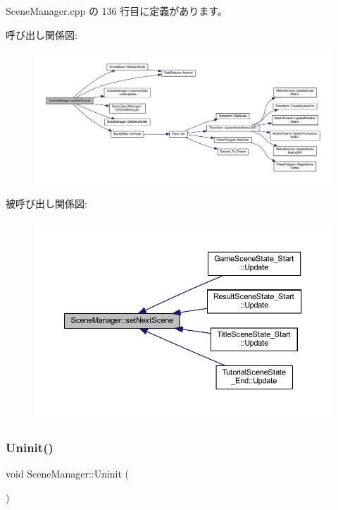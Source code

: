  Scene\+Manager.\+cpp の 136 行目に定義があります。

呼び出し関係図\+:
\nopagebreak
\begin{figure}[H]
\begin{center}
\leavevmode
\includegraphics[width=350pt]{class_scene_manager_a208cc1690dcb260ae7fb94d13118f6ce_cgraph}
\end{center}
\end{figure}
被呼び出し関係図\+:
\nopagebreak
\begin{figure}[H]
\begin{center}
\leavevmode
\includegraphics[width=350pt]{class_scene_manager_a208cc1690dcb260ae7fb94d13118f6ce_icgraph}
\end{center}
\end{figure}
\mbox{\label{class_scene_manager_ae3ff21f2261fc50f1e860cf7fc3a2108}} 
\subsubsection{\texorpdfstring{Uninit()}{Uninit()}}
{\footnotesize\ttfamily void Scene\+Manager\+::\+Uninit (\begin{DoxyParamCaption}{ }\end{DoxyParamCaption})}



